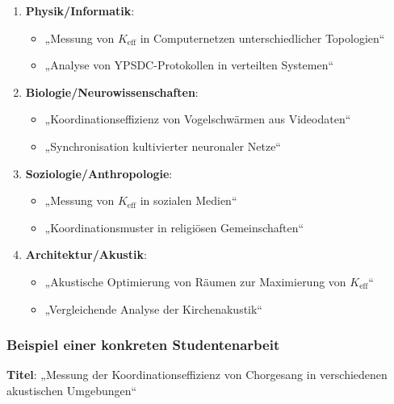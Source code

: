 \documentclass[12pt,a4paper]{article}
\begin{document}
	\begin{enumerate}
		\item \textbf{Physik/Informatik}:
		\begin{itemize}
			\item „Messung von $K_{\mathrm{eff}}$ in Computernetzen unterschiedlicher Topologien“
			\item „Analyse von YPSDC-Protokollen in verteilten Systemen“
		\end{itemize}
		
		\item \textbf{Biologie/Neurowissenschaften}:
		\begin{itemize}
			\item „Koordinationseffizienz von Vogelschwärmen aus Videodaten“
			\item „Synchronisation kultivierter neuronaler Netze“
		\end{itemize}
		
		\item \textbf{Soziologie/Anthropologie}:
		\begin{itemize}
			\item „Messung von $K_{\mathrm{eff}}$ in sozialen Medien“
			\item „Koordinationsmuster in religiösen Gemeinschaften“
		\end{itemize}
		
		\item \textbf{Architektur/Akustik}:
		\begin{itemize}
			\item „Akustische Optimierung von Räumen zur Maximierung von $K_{\mathrm{eff}}$“
			\item „Vergleichende Analyse der Kirchenakustik“
		\end{itemize}
	\end{enumerate}
	
	\subsubsection{Beispiel einer konkreten Studentenarbeit}
	
	\textbf{Titel}: „Messung der Koordinationseffizienz von Chorgesang in verschiedenen akustischen Umgebungen“
	
\end{document}
